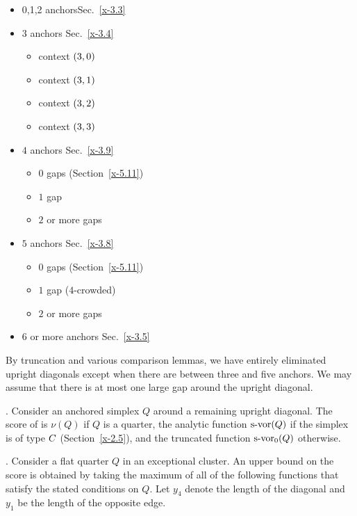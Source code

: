     \begin{itemize}
    \item 0,1,2 anchors\hfill Sec.~\ref{x-3.3}
    \item $3$ anchors \hfill Sec.~\ref{x-3.4}
        \begin{itemize}
        \item context $\relax(3,0)$
        \item context $\relax(3,1)$
        \item context $\relax(3,2)$
        \item context $\relax(3,3)$
        \end{itemize}
    \item $4$ anchors \hfill Sec.~\ref{x-3.9}
        \begin{itemize}
        \item $0$ gaps (Section~\ref{x-5.11})
        \item $1$ gap
        \item $2$ or more gaps
        \end{itemize}
    \item $5$ anchors \hfill Sec.~\ref{x-3.8}
        \begin{itemize}
        \item $0$ gaps (Section~\ref{x-5.11})
        \item $1$ gap ($4$-crowded)
        \item $2$ or more gaps
        \end{itemize}
    \item $6$ or more anchors \hfill Sec.~\ref{x-3.5}
    \end{itemize}


\smallskip
By truncation and various comparison lemmas, we have entirely eliminated
upright diagonals except when there are between three and five anchors.
We may assume that there is at most one large gap around the upright
diagonal.

.  Consider an anchored simplex $Q$ around a remaining upright
diagonal. The score of is $\nu(Q)$ if $Q$ is a quarter, the
analytic function $\operatorname{s-vor}(Q)$ if the simplex is of type $C$
(Section~\ref{x-2.5}), and the truncated function $\operatorname{s-vor}_0(Q)$
otherwise.

.  Consider a flat quarter $Q$ in an exceptional cluster. An
upper bound on the score is obtained by taking the maximum of all
of the following functions that satisfy the stated conditions on
$Q$.  Let $y_4$ denote the length of the diagonal and $y_1$ be the
length of the opposite edge.

